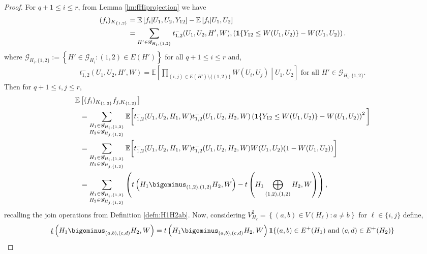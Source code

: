 \documentclass[11pt,reqno]{amsart}
\numberwithin{equation}{section}
\newcommand{\one}{{\bf 1}}
\newcommand{\E}{\mathbb{E}}
\theoremstyle{definition}
\begin{document}
\begin{proof} 
For $q+1 \leq i \leq r$, from Lemma \ref{lm:fHiprojection} we have 
\begin{align*}
    (f_{i})_{K_{\{1,2\}}} & = \mathbb{E}\left[f_{i}\middle| U_{1},U_{2},Y_{12}\right] - \mathbb{E}\left[f_{i}\middle| U_{1},U_{2}\right] \nonumber \\ 
    & = \sum_{H'\in\mathscr{G}_{H_{i},\{1,2\}}} t^-_{1,2}(U_{1},U_2,H',W) , 
\left(\one\{Y_{12}\leq W(U_{1},U_{2})\} -W(U_1, U_2)\right).
\end{align*}
where $\mathscr{G}_{H_{i},\{1,2\}} := \left\{H'\in \mathscr{G}_{H_{i}}:(1,2)\in E(H')\right\}$ for all $q+1\leq i\leq r$ and,
\begin{align*}
    t_{1,2}^{-}\left(U_1, U_2, H', W\right) = \E\left[\prod_{(i,j)\in E(H')\setminus\{(1,2)\}}W(U_i, U_j)\middle|U_1, U_2\right]\text{ for all }H'\in\mathscr{G}_{H_{i},\{1,2\}}.
\end{align*}
Then for $q+1 \leq i,j\leq r$, 
\begin{align}\label{eq:Cov-fifj-1}
    \mathbb{E}
    &\left[(f_{i})_{K_{\{1,2\}}}f_{j,K_{\{1,2\}}}\right]\nonumber\\
    & = \sum_{\substack{H_{1}\in\mathscr{G}_{H_{i},\{1,2\}}\\ H_{2}\in\mathscr{G}_{H_{j,\{1,2\}}}}}\mathbb{E}\bigg[t^-_{1,2}(U_{1},U_2,H_{1},W)t^-_{1,2}(U_{1},U_2,H_{2},W)\left(\one\{Y_{12}\leq W(U_{1},U_{2})\} -W(U_1, U_2)\right)^2\bigg]\nonumber\\
    & = \sum_{\substack{H_{1}\in\mathscr{G}_{H_{i},\{1,2\}}\\ H_{2}\in\mathscr{G}_{H_{j,\{1,2\}}}}}\mathbb{E}\bigg[t^-_{1,2}(U_{1},U_2,H_{1},W)t^-_{1,2}(U_{1},U_2,H_{2},W)W(U_{1},U_{2})(1-W(U_{1},U_{2}))\bigg]\nonumber\\
    & = \sum_{\substack{H_{1}\in\mathscr{G}_{H_{i},\{1,2\}}\\ H_{2}\in\mathscr{G}_{H_{j,\{1,2\}}}}}\left(t\left(H_{1}\bigominus_{(1,2),(1,2)}H_{2},W\right) - t\left(H_{1}\bigoplus_{(1,2),(1,2)}H_{2},W\right)\right) , 
\end{align}
recalling the join operations from Definition \ref{defn:H1H2ab}. Now, considering $V_{H_{\ell}}^{2} = \left\{(a,b)\in V(H_{\ell}):a\neq b\right\}$ for $\ell \in \{i,j\}$ define,
\begin{align*}
    \underline{t}\left(H_{1}\bigominus_{(a,b),(c,d)} H_{2},W\right) =  
    t\left(H_{1}\bigominus_{(a,b),(c,d)} H_{2},W\right) \bm 1\{(a,b) \in E^{+}(H_{1}) \text{ and }(c,d) \in E^{+}(H_{2})\}
 \end{align*} 

\end{proof}
\end{document}
